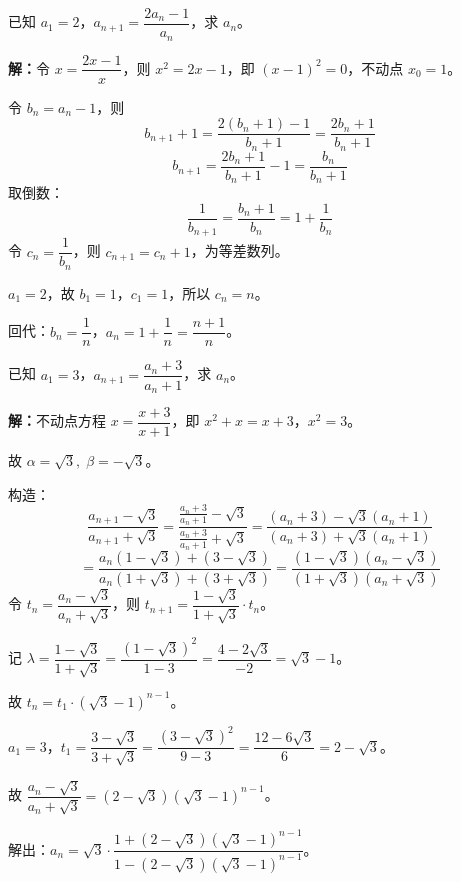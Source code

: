 \documentclass[12pt, a4paper]{ctexart}
\begin{document}
\begin{examplebox}[【例题3】不动点法解分式线性递推]
已知 $a_1 = 2$，$a_{n+1} = \dfrac{2a_n - 1}{a_n}$，求 $a_n$。
\end{examplebox}

\textbf{解：}令 $x = \dfrac{2x-1}{x}$，则 $x^2 = 2x - 1$，即 $(x-1)^2 = 0$，不动点 $x_0 = 1$。

令 $b_n = a_n - 1$，则
\[
b_{n+1} + 1 = \frac{2(b_n+1)-1}{b_n+1} = \frac{2b_n + 1}{b_n + 1}
\]
\[
b_{n+1} = \frac{2b_n + 1}{b_n + 1} - 1 = \frac{b_n}{b_n + 1}
\]
取倒数：
\[
\frac{1}{b_{n+1}} = \frac{b_n + 1}{b_n} = 1 + \frac{1}{b_n}
\]
令 $c_n = \dfrac{1}{b_n}$，则 $c_{n+1} = c_n + 1$，为等差数列。

$a_1 = 2$，故 $b_1 = 1$，$c_1 = 1$，所以 $c_n = n$。

回代：$b_n = \dfrac{1}{n}$，$a_n = 1 + \dfrac{1}{n} = \dfrac{n+1}{n}$。

\begin{examplebox}[【例题4】双不动点分式递推]
已知 $a_1 = 3$，$a_{n+1} = \dfrac{a_n + 3}{a_n + 1}$，求 $a_n$。
\end{examplebox}

\textbf{解：}不动点方程 $x = \dfrac{x+3}{x+1}$，即 $x^2 + x = x + 3$，$x^2 = 3$。

故 $\alpha = \sqrt{3},\;\beta = -\sqrt{3}$。

构造：
\[
\frac{a_{n+1} - \sqrt{3}}{a_{n+1} + \sqrt{3}} = \frac{\frac{a_n+3}{a_n+1} - \sqrt{3}}{\frac{a_n+3}{a_n+1} + \sqrt{3}} = \frac{(a_n+3) - \sqrt{3}(a_n+1)}{(a_n+3) + \sqrt{3}(a_n+1)}
\]
\[
= \frac{a_n(1-\sqrt{3}) + (3-\sqrt{3})}{a_n(1+\sqrt{3}) + (3+\sqrt{3})} = \frac{(1-\sqrt{3})(a_n - \sqrt{3})}{(1+\sqrt{3})(a_n + \sqrt{3})}
\]
令 $t_n = \dfrac{a_n - \sqrt{3}}{a_n + \sqrt{3}}$，则 $t_{n+1} = \dfrac{1-\sqrt{3}}{1+\sqrt{3}} \cdot t_n$。

记 $\lambda = \dfrac{1-\sqrt{3}}{1+\sqrt{3}} = \dfrac{(1-\sqrt{3})^2}{1-3} = \dfrac{4-2\sqrt{3}}{-2} = \sqrt{3}-1$。

故 $t_n = t_1 \cdot (\sqrt{3}-1)^{n-1}$。

$a_1 = 3$，$t_1 = \dfrac{3-\sqrt{3}}{3+\sqrt{3}} = \dfrac{(3-\sqrt{3})^2}{9-3} = \dfrac{12-6\sqrt{3}}{6} = 2-\sqrt{3}$。

故 $\dfrac{a_n - \sqrt{3}}{a_n + \sqrt{3}} = (2-\sqrt{3})(\sqrt{3}-1)^{n-1}$。

解出：$a_n = \sqrt{3} \cdot \dfrac{1 + (2-\sqrt{3})(\sqrt{3}-1)^{n-1}}{1 - (2-\sqrt{3})(\sqrt{3}-1)^{n-1}}$。
\end{document}

